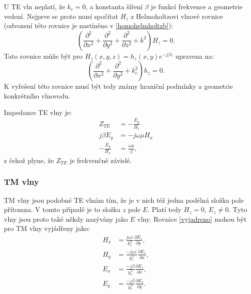 \documentclass[12pt,a4paper,oneside]{article}
\numberwithin{equation}{section} %
\numberwithin{figure}{section} %
\numberwithin{table}{section} %
\begin{document}
U TE vln neplatí, že $k_c = 0$, a konstanta šíření $\beta$ je funkcí frekvence a geometrie vedení. Nejprve se proto musí spočítat $H_z$ z Helmoholtzovi vlnové rovnice (odvození této rovnice je nastíněno v \ref{homohelmholtzb}):
\begin{equation}
\left( \frac{\partial ^2}{\partial x^2} + \frac{\partial ^2}{\partial y^2} + \frac{\partial ^2}{\partial z^2} + k^2 \right) H_z = 0 .
\end{equation}
Tato rovnice může být pro $H_z(x,y,z) = h_z(x,y)e^{-j \beta z}$ upravena na:
\begin{equation}
\left( \frac{\partial ^2}{\partial x^2} + \frac{\partial ^2}{\partial y^2} + k^2_c \right) h_z = 0 .
\end{equation}
K vyřešení této rovnice musí být tedy známy hraniční podmínky a geometrie konkrétního vlnovodu.

Impedance TE vlny je:
\begin{subequations}
\begin{align}
Z_{TE} &= - \frac{E_y}{H_x}
\\
j \beta E_y &= - j \omega \mu H_x
\\
- \frac{E_y}{H_x} &= \frac{\omega \mu}{\beta} ,
\end{align}
\end{subequations}
z čehož plyne, že $Z_{TE}$ je frekvenčně závislé.

\subsubsection{TM vlny}
TM vlny jsou podobné TE vlnám tím, že je v nich též jedna podélná složka pole přítomna. V tomto případě je to složka $z$ pole $E$. Platí tedy $H_z = 0$, $E_z \neq 0$. Tyto vlny jsou proto také někdy nazývány jako $E$ vlny. Rovnice \ref{vyjadreno} mohou být pro TM vlny vyjádřeny jako:
\begin{subequations}
\begin{align}
H_x &= \frac{j \omega \varepsilon}{k^2_c} \frac{\partial E_z}{\partial y} ,
\\
H_y &= \frac{-j \omega \varepsilon}{k^2_c} \frac{\partial E_z}{\partial x} ,
\\
E_x &= \frac{-j \beta}{k^2_c} \frac{\partial E_z}{\partial x} ,
\\
E_y &= \frac{-j \beta}{k^2_c} \frac{\partial E_z}{\partial y} .
\end{align}
\end{subequations}
\end{document}
